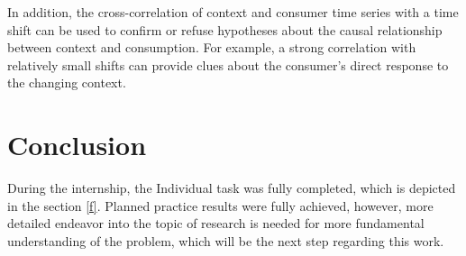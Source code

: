 \documentclass[13pt, a4paper]{article}
\begin{document}
In addition, the cross-correlation of context and consumer time series with a time shift can be used to confirm or refuse hypotheses about the causal relationship between context and consumption. For example, a strong correlation with relatively small shifts can provide clues about the consumer's direct response to the changing context. 

\section{Conclusion}

During the internship, the Individual task was fully completed, which is depicted in the section \ref{f}. Planned practice results were fully achieved, however, more detailed endeavor into the topic of research is needed for more fundamental understanding of the problem, which will be the next step regarding this work.

\newpage



{}

\end{document}
